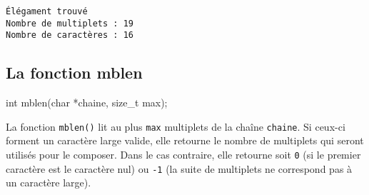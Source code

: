 \documentclass[]{article}
\newenvironment{Shaded}{}{}
\newcommand{\DataTypeTok}[1]{\textcolor[rgb]{0.56,0.13,0.00}{{#1}}}
\newcommand{\DecValTok}[1]{\textcolor[rgb]{0.25,0.63,0.44}{{#1}}}
\newcommand{\SpecialCharTok}[1]{\textcolor[rgb]{0.25,0.44,0.63}{{#1}}}
\newcommand{\StringTok}[1]{\textcolor[rgb]{0.25,0.44,0.63}{{#1}}}
\newcommand{\ImportTok}[1]{{#1}}
\newcommand{\ControlFlowTok}[1]{\textcolor[rgb]{0.00,0.44,0.13}{\textbf{{#1}}}}
\newcommand{\PreprocessorTok}[1]{\textcolor[rgb]{0.74,0.48,0.00}{{#1}}}
\newcommand{\NormalTok}[1]{{#1}}
\begin{document}
\begin{verbatim}
Élégament trouvé
Nombre de multiplets : 19
Nombre de caractères : 16
\end{verbatim}

\subsection{La fonction mblen}\label{la-fonction-mblen}

\begin{Shaded}
\begin{Highlighting}[]
\DataTypeTok{int} \NormalTok{mblen(}\DataTypeTok{char} \NormalTok{*chaine, }\DataTypeTok{size_t} \NormalTok{max);}
\end{Highlighting}
\end{Shaded}

La fonction \texttt{mblen()} lit au plus \texttt{max} multiplets de la
chaîne \texttt{chaine}. Si ceux-ci forment un caractère large valide,
elle retourne le nombre de multiplets qui seront utilisés pour le
composer. Dans le cas contraire, elle retourne soit \texttt{0} (si le
premier caractère est le caractère nul) ou \texttt{-1} (la suite de
multiplets ne correspond pas à un caractère large).

\begin{Shaded}
\end{Shaded}
\end{document}
